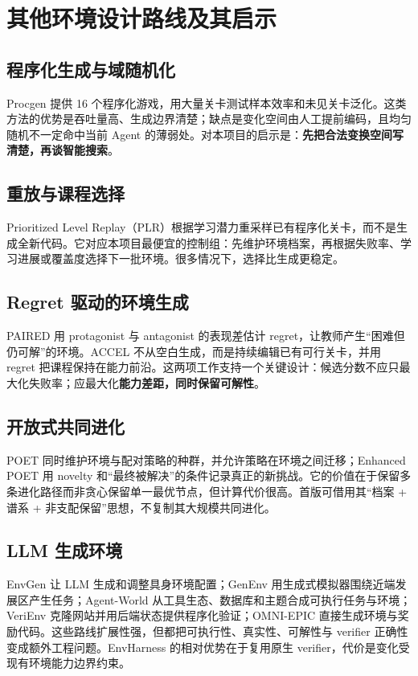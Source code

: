 \documentclass[11pt,a4paper,fontset=fandol]{ctexart}
\begin{document}
\section{其他环境设计路线及其启示}

\subsection{程序化生成与域随机化}

Procgen 提供 16 个程序化游戏，用大量关卡测试样本效率和未见关卡泛化\cite{procgen}。这类方法的优势是吞吐量高、生成边界清楚；缺点是变化空间由人工提前编码，且均匀随机不一定命中当前 Agent 的薄弱处。对本项目的启示是：\textbf{先把合法变换空间写清楚，再谈智能搜索}。

\subsection{重放与课程选择}

Prioritized Level Replay（PLR）根据学习潜力重采样已有程序化关卡，而不是生成全新代码\cite{plr}。它对应本项目最便宜的控制组：先维护环境档案，再根据失败率、学习进展或覆盖度选择下一批环境。很多情况下，选择比生成更稳定。

\subsection{Regret 驱动的环境生成}

PAIRED 用 protagonist 与 antagonist 的表现差估计 regret，让教师产生“困难但仍可解”的环境\cite{paired}。ACCEL 不从空白生成，而是持续编辑已有可行关卡，并用 regret 把课程保持在能力前沿\cite{accel}。这两项工作支持一个关键设计：候选分数不应只最大化失败率；应最大化\textbf{能力差距，同时保留可解性}。

\subsection{开放式共同进化}

POET 同时维护环境与配对策略的种群，并允许策略在环境之间迁移；Enhanced POET 用 novelty 和“最终被解决”的条件记录真正的新挑战\cite{poet}。它的价值在于保留多条进化路径而非贪心保留单一最优节点，但计算代价很高。首版可借用其“档案 + 谱系 + 非支配保留”思想，不复制其大规模共同进化。

\subsection{LLM 生成环境}

EnvGen 让 LLM 生成和调整具身环境配置\cite{envgen}；GenEnv 用生成式模拟器围绕近端发展区产生任务\cite{genenv}；Agent-World 从工具生态、数据库和主题合成可执行任务与环境\cite{agentworld}；VeriEnv 克隆网站并用后端状态提供程序化验证\cite{verienv}；OMNI-EPIC 直接生成环境与奖励代码\cite{omniepic}。这些路线扩展性强，但都把可执行性、真实性、可解性与 verifier 正确性变成额外工程问题。EnvHarness 的相对优势在于复用原生 verifier，代价是变化受现有环境能力边界约束。
\end{document}
